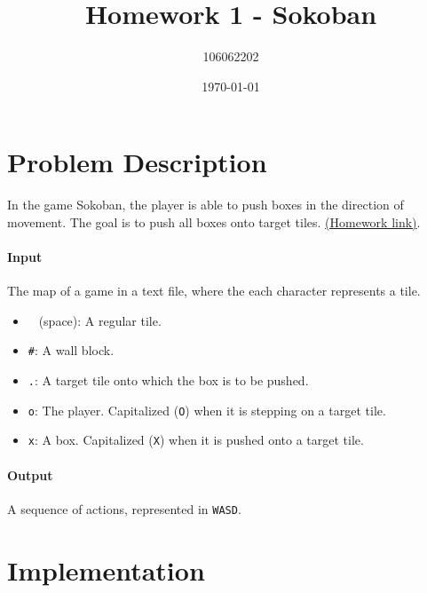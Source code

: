 \documentclass[a4paper, 10pt]{article}
\title{Homework 1 - Sokoban}
\author{106062202}
\date{\today}
\begin{document}
    \maketitle

    \section{Problem Description}
        In the game Sokoban, the player is able to push boxes in the direction of movement.
        The goal is to push all boxes onto target tiles. 
        \href{http://lms.nthu.edu.tw/course.php?courseID=43477&f=hw&hw=214237}{(Homework link)}.
        \paragraph{Input}
            The map of a game in a text file, where the each character represents a tile.
            \begin{itemize}
                \item \texttt{ } (space): A regular tile.
                \item \texttt{\#}: A wall block.
                \item \texttt{.}: A target tile onto which the box is to be pushed.
                \item \texttt{o}: The player. Capitalized (\texttt{O}) when it is stepping on a target tile.
                \item \texttt{x}: A box. Capitalized (\texttt{X}) when it is pushed onto a target tile.
            \end{itemize}
        \paragraph{Output}
            A sequence of actions, represented in \texttt{WASD}.

    \section{Implementation}
\end{document}
